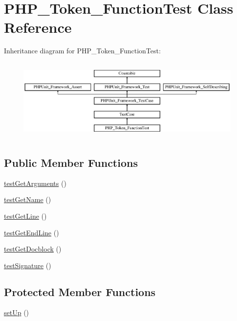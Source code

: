 \hypertarget{class_p_h_p___token___function_test}{}\section{P\+H\+P\+\_\+\+Token\+\_\+\+Function\+Test Class Reference}
\label{class_p_h_p___token___function_test}
Inheritance diagram for P\+H\+P\+\_\+\+Token\+\_\+\+Function\+Test\+:\begin{figure}[H]
\begin{center}
\leavevmode
\includegraphics[height=4.129793cm]{class_p_h_p___token___function_test}
\end{center}
\end{figure}
\subsection*{Public Member Functions}
\begin{DoxyCompactItemize}
\item 
\mbox{\hyperlink{class_p_h_p___token___function_test_a8d82fab2979421a0bbb9e3315599a10f}{test\+Get\+Arguments}} ()
\item 
\mbox{\hyperlink{class_p_h_p___token___function_test_a20d1601e22a17dad9eb8c9050676ef70}{test\+Get\+Name}} ()
\item 
\mbox{\hyperlink{class_p_h_p___token___function_test_adec279f2d758882ab4b28cd8f77a6be1}{test\+Get\+Line}} ()
\item 
\mbox{\hyperlink{class_p_h_p___token___function_test_a0d912911a630087e21244feb63123cc8}{test\+Get\+End\+Line}} ()
\item 
\mbox{\hyperlink{class_p_h_p___token___function_test_acaf43b035b1eae02219e7f2c9105de54}{test\+Get\+Docblock}} ()
\item 
\mbox{\hyperlink{class_p_h_p___token___function_test_a9f6011d072e71f3a7137341a637c13a6}{test\+Signature}} ()
\end{DoxyCompactItemize}
\subsection*{Protected Member Functions}
\begin{DoxyCompactItemize}
\item 
\mbox{\hyperlink{class_p_h_p___token___function_test_a0bc688732d2b3b162ffebaf7812e78da}{set\+Up}} ()
\end{DoxyCompactItemize}
